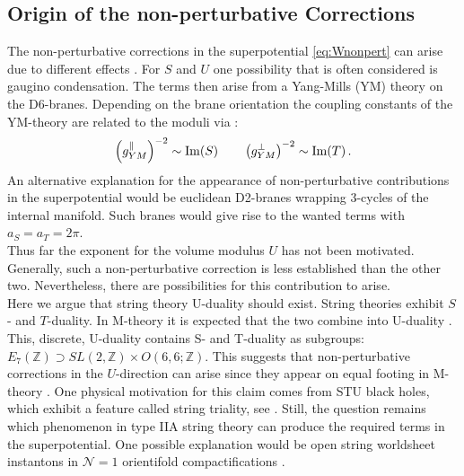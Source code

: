 \documentclass[12pt]{report}
\newcommand{\be}{\begin{equation}}
\newcommand{\ee}{\end{equation}}
\def\rmim{{\rm Im}}
\begin{document}
\subsection{Origin of the non-perturbative Corrections}
The non-perturbative corrections in the superpotential \ref{eq:Wnonpert} can arise due to different effects \cite{Palti:2008mg}. For $S$ and $U$ one possibility that is often considered is gaugino condensation. The terms then arise from a Yang-Mills (YM) theory on the D6-branes. Depending on the brane orientation the coupling constants of the YM-theory are related to the moduli via \cite{Danielsson:2013rza}:
\be
\left(g_{YM}^\parallel \right)^{-2} \sim \rmim (S) \qquad \left(g_{YM}^\perp \right)^{-2} \sim \rmim (T)\,.
\ee
An alternative explanation for the appearance of non-perturbative contributions in the superpotential would be euclidean D2-branes wrapping 3-cycles of the internal manifold. Such branes would give rise to the wanted terms with $a_S =a_T= 2\pi$.\\
Thus far the exponent for the volume modulus $U$ has not been motivated. Generally, such a non-perturbative correction is less established than the other two. Nevertheless, there are possibilities for this contribution to arise. \\
Here we argue that string theory U-duality should exist. String theories exhibit $S$- and $T$-duality. In M-theory it is expected that the two combine into U-duality \cite{Hull:1994ys,Schwarz:1996bh}. This, discrete, U-duality  contains S- and T-duality as subgroups: $E_7(\mathbb{Z}) \supset SL(2,\mathbb{Z}) \times O(6,6;\mathbb{Z})$. This suggests that non-perturbative corrections in the $U$-direction can arise since they appear on equal footing in M-theory \cite{Acharya:2007rc}. One physical motivation for this claim comes from STU black holes, which exhibit a feature called string triality, see \cite{Behrndt:1996hu}. Still, the question remains which phenomenon in type IIA string theory can produce the required terms in the superpotential. One possible explanation would be open  string worldsheet instantons in $\mathcal{N} = 1$ orientifold compactifications \cite{Kachru:2000ih,Blumenhagen:2009qh}.\\
\end{document}
